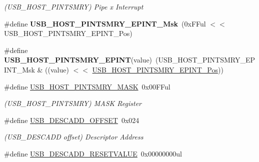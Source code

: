 \begin{DoxyCompactItemize}
\begin{DoxyCompactList}\small\item\em (U\+S\+B\+\_\+\+H\+O\+S\+T\+\_\+\+P\+I\+N\+T\+S\+M\+R\+Y) Pipe x Interrupt \end{DoxyCompactList}\item 
\hypertarget{group___s_a_m_l21___u_s_b_gaaf6d2ae6a79c4c0d5f623fa966aac15d}{}\#define {\bfseries U\+S\+B\+\_\+\+H\+O\+S\+T\+\_\+\+P\+I\+N\+T\+S\+M\+R\+Y\+\_\+\+E\+P\+I\+N\+T\+\_\+\+Msk}~(0x\+F\+Ful $<$$<$ U\+S\+B\+\_\+\+H\+O\+S\+T\+\_\+\+P\+I\+N\+T\+S\+M\+R\+Y\+\_\+\+E\+P\+I\+N\+T\+\_\+\+Pos)\label{group___s_a_m_l21___u_s_b_gaaf6d2ae6a79c4c0d5f623fa966aac15d}

\item 
\hypertarget{group___s_a_m_l21___u_s_b_gaa203108a24e80730803b94fe30fd44b6}{}\#define {\bfseries U\+S\+B\+\_\+\+H\+O\+S\+T\+\_\+\+P\+I\+N\+T\+S\+M\+R\+Y\+\_\+\+E\+P\+I\+N\+T}(value)~(U\+S\+B\+\_\+\+H\+O\+S\+T\+\_\+\+P\+I\+N\+T\+S\+M\+R\+Y\+\_\+\+E\+P\+I\+N\+T\+\_\+\+Msk \& ((value) $<$$<$ \hyperlink{group___s_a_m_l21___u_s_b_ga8190d68c8a2825f05d0c3fcfe946fc2b}{U\+S\+B\+\_\+\+H\+O\+S\+T\+\_\+\+P\+I\+N\+T\+S\+M\+R\+Y\+\_\+\+E\+P\+I\+N\+T\+\_\+\+Pos}))\label{group___s_a_m_l21___u_s_b_gaa203108a24e80730803b94fe30fd44b6}

\item 
\hypertarget{group___s_a_m_l21___u_s_b_ga31cbbf1ae1899ed073c8fcceb4e05297}{}\#define \hyperlink{group___s_a_m_l21___u_s_b_ga31cbbf1ae1899ed073c8fcceb4e05297}{U\+S\+B\+\_\+\+H\+O\+S\+T\+\_\+\+P\+I\+N\+T\+S\+M\+R\+Y\+\_\+\+M\+A\+S\+K}~0x00\+F\+Ful\label{group___s_a_m_l21___u_s_b_ga31cbbf1ae1899ed073c8fcceb4e05297}

\begin{DoxyCompactList}\small\item\em (U\+S\+B\+\_\+\+H\+O\+S\+T\+\_\+\+P\+I\+N\+T\+S\+M\+R\+Y) M\+A\+S\+K Register \end{DoxyCompactList}\item 
\hypertarget{group___s_a_m_l21___u_s_b_ga4ba311333b0e09b0d5953f939a2f34a6}{}\#define \hyperlink{group___s_a_m_l21___u_s_b_ga4ba311333b0e09b0d5953f939a2f34a6}{U\+S\+B\+\_\+\+D\+E\+S\+C\+A\+D\+D\+\_\+\+O\+F\+F\+S\+E\+T}~0x024\label{group___s_a_m_l21___u_s_b_ga4ba311333b0e09b0d5953f939a2f34a6}

\begin{DoxyCompactList}\small\item\em (U\+S\+B\+\_\+\+D\+E\+S\+C\+A\+D\+D offset) Descriptor Address \end{DoxyCompactList}\item 
\hypertarget{group___s_a_m_l21___u_s_b_ga7020ff7516bd23dbe929107815c18ad5}{}\#define \hyperlink{group___s_a_m_l21___u_s_b_ga7020ff7516bd23dbe929107815c18ad5}{U\+S\+B\+\_\+\+D\+E\+S\+C\+A\+D\+D\+\_\+\+R\+E\+S\+E\+T\+V\+A\+L\+U\+E}~0x00000000ul\label{group___s_a_m_l21___u_s_b_ga7020ff7516bd23dbe929107815c18ad5}


\end{DoxyCompactItemize}

